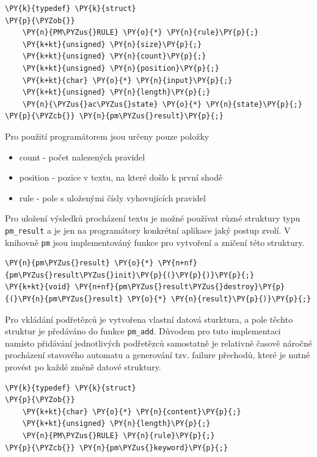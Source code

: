 \begin{Verbatim}[commandchars=\\\{\}]
\PY{k}{typedef} \PY{k}{struct}
\PY{p}{\PYZob{}}
	\PY{n}{PM\PYZus{}RULE} \PY{o}{*} \PY{n}{rule}\PY{p}{;}
	\PY{k+kt}{unsigned} \PY{n}{size}\PY{p}{;}
	\PY{k+kt}{unsigned} \PY{n}{count}\PY{p}{;}
	\PY{k+kt}{unsigned} \PY{n}{position}\PY{p}{;}
	\PY{k+kt}{char} \PY{o}{*} \PY{n}{input}\PY{p}{;}
	\PY{k+kt}{unsigned} \PY{n}{length}\PY{p}{;}
	\PY{n}{\PYZus{}ac\PYZus{}state} \PY{o}{*} \PY{n}{state}\PY{p}{;}
\PY{p}{\PYZcb{}} \PY{n}{pm\PYZus{}result}\PY{p}{;}
\end{Verbatim}

Pro použití programátorem jsou určeny pouze položky

\begin{itemize}
	\item{count - počet nalezených pravidel}
	\item{position - pozice v textu, na které došlo k první shodě}
	\item{rule - pole s uloženými čísly vyhovujících pravidel}
\end{itemize}

Pro uložení výsledků procházení textu je možné používat různé struktury typu \texttt{pm\_result}
a je jen na programátory konkrétní aplikace jaký postup zvolí.
V knihovně \texttt{pm} jsou implementováný funkce pro vytvoření a zničení této struktury.

\begin{Verbatim}[commandchars=\\\{\}]
\PY{n}{pm\PYZus{}result} \PY{o}{*} \PY{n+nf}{pm\PYZus{}result\PYZus{}init}\PY{p}{(}\PY{p}{)}\PY{p}{;}
\PY{k+kt}{void} \PY{n+nf}{pm\PYZus{}result\PYZus{}destroy}\PY{p}{(}\PY{n}{pm\PYZus{}result} \PY{o}{*} \PY{n}{result}\PY{p}{)}\PY{p}{;}
\end{Verbatim}


Pro vkládání podřetězců je vytvořena vlastní datová sturktura, a pole těchto struktur je předáváno do funkce
\texttt{pm\_add}. Důvodem pro tuto implementaci namísto přidávání jednotlivých podřetězců samostatně
je relativně časově náročné procházení stavového automatu a generování tzv. failure přechodů,
které je nutné provést po každé změně datové struktury.

\begin{Verbatim}[commandchars=\\\{\}]
\PY{k}{typedef} \PY{k}{struct}
\PY{p}{\PYZob{}}
	\PY{k+kt}{char} \PY{o}{*} \PY{n}{content}\PY{p}{;}
	\PY{k+kt}{unsigned} \PY{n}{length}\PY{p}{;}
	\PY{n}{PM\PYZus{}RULE} \PY{n}{rule}\PY{p}{;}
\PY{p}{\PYZcb{}} \PY{n}{pm\PYZus{}keyword}\PY{p}{;}
\end{Verbatim}

